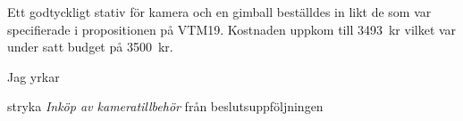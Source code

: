\documentclass[../_main/handlingar.tex]{subfiles}
\begin{document}

    Ett godtyckligt stativ för kamera och en gimball beställdes in likt de som var specifierade i propositionen på VTM19. Kostnaden uppkom till \SI{3493}{kr} vilket var under satt budget på \SI{3500}{kr}. 


    Jag yrkar 
\begin{attsatser}
    \att stryka \emph{Inköp av kameratillbehör} från beslutsuppföljningen
\end{attsatser}

\begin{signatures}{1}
    \signature{Sonja Kenari}{}
\end{signatures}
\end{document}
